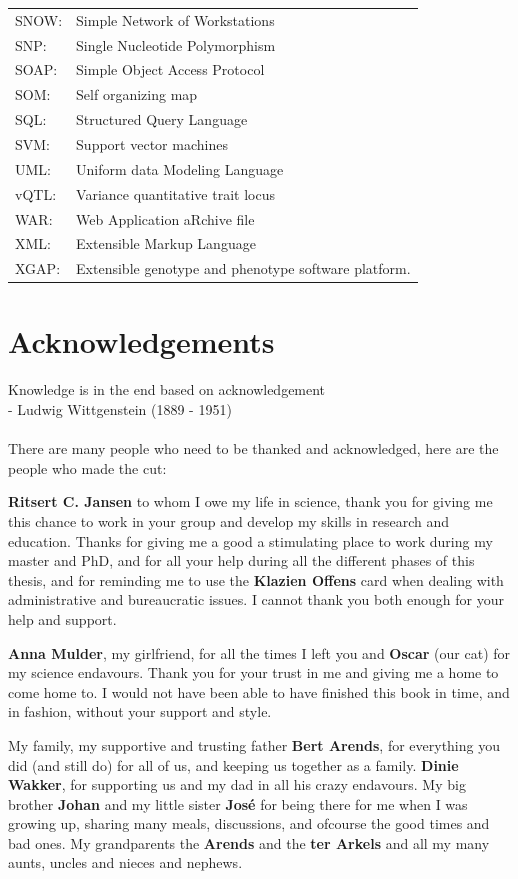 {\begin{tabular}{ l l }
SNOW:        & Simple Network of Workstations\\
SNP:         & Single Nucleotide Polymorphism\\
SOAP:        & Simple Object Access Protocol\\
SOM:         & Self organizing map\\
SQL:         & Structured Query Language\\
SVM:         & Support vector machines\\
UML:         & Uniform data Modeling Language\\
vQTL:        & Variance quantitative trait locus\\
WAR:         & Web Application aRchive file\\
XML:         & Extensible Markup Language\\
XGAP:        & Extensible genotype and phenotype software platform.
\end{tabular}
}
\newpage

\section{Acknowledgements}
Knowledge is in the end based on acknowledgement\\
- Ludwig Wittgenstein (1889 - 1951)\\\\

There are many people who need to be thanked and acknowledged, 
here are the people who made the cut:

{\bf Ritsert C. Jansen} to whom I owe my life in science, thank you for giving me this chance 
to work in your group and develop my skills in research and education. Thanks for giving me 
a good a stimulating place to work during my master and PhD, and for all your help during all 
the different phases of this thesis, and for reminding me to use the {\bf Klazien Offens} card 
when dealing with administrative and bureaucratic issues. I cannot thank you both enough for 
your help and support.

{\bf Anna Mulder}, my girlfriend, for all the times I left you and {\bf Oscar} (our cat) for my 
science endavours. Thank you for your trust in me and giving me a home to come home to. 
I would not have been able to have finished this book in time, and in fashion, without your support and style. 

My family, my supportive and trusting father {\bf Bert Arends}, for everything you did (and 
still do) for all of us, and keeping us together as a family. {\bf Dinie Wakker}, for supporting 
us and my dad in all his crazy endavours. My big brother {\bf Johan} and my little sister 
{\bf Jos\'{e}} for being there for me when I was growing up, sharing many meals, discussions, 
and ofcourse the good times and bad ones. My grandparents the {\bf Arends} and the {\bf ter 
Arkels} and all my many aunts, uncles and nieces and nephews.

